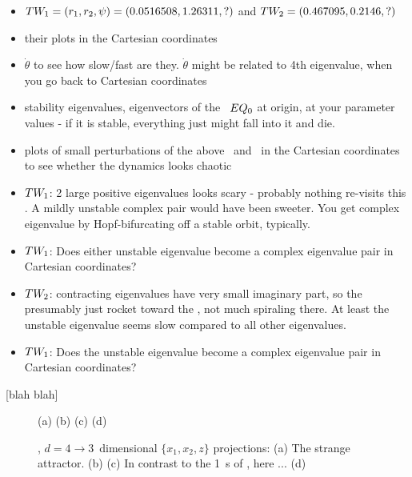 \documentclass[aip,cha,
reprint,
secnumarabic,
nofootinbib, tightenlines,
nobibnotes, showkeys, showpacs,
groupedaddress,
]{revtex4-1}
\begin{document}
\begin{itemize}
  \item $TW_{1} = (r_1,r_2,\psi)=(0.0516508, 1.26311,?)$ and
        $TW_{2} = (0.467095,0.2146,?)$
  \item their plots in the Cartesian coordinates
  \item $\dot{\theta}$ to see how slow/fast are they. $\dot{\theta}$
        might be related to 4th eigenvalue, when you go back
        to Cartesian coordinates
  \item stability eigenvalues, eigenvectors of the \eqv\ $EQ_{0}$ at
        origin, at your parameter values - if it is stable, everything
        just might fall into it and die.
  \item plots of small perturbations of the above \eqv\ and \reqva\ in
        the Cartesian coordinates to see whether the dynamics looks
        chaotic
  \item $TW_{1}$: 2 large positive eigenvalues looks scary - probably
        nothing re-visits this \reqv. A mildly unstable complex pair
        would have been sweeter. You get complex eigenvalue by Hopf-bifurcating off a
        stable orbit, typically.
  \item $TW_{1}$: Does either unstable eigenvalue become a complex
        eigenvalue pair in Cartesian coordinates?
  \item $TW_{2}$: contracting eigenvalues have very small imaginary
        part, so the presumably just rocket toward the \reqv, not much
        spiraling there. At least the unstable eigenvalue seems slow
        compared to all other eigenvalues.
  \item $TW_{1}$: Does the unstable eigenvalue become a complex
        eigenvalue pair in Cartesian coordinates?
\end{itemize}

 [blah blah]



\begin{figure}
  	\begin{center}
(a)
(b)
(c)
(d)
    \end{center}
  \caption{
  \twoMode, $d=4 \to 3$~dimensional $\{x_1,x_2,z\}$ projections:
  (a)
  The strange attractor.
  (b)
 (c)
 In contrast
 to the 1\dmn\ \poincBord s of , here ...
 (d)
  }
\label{fig:2ModeAtlas}
\end{figure}
\end{document}
